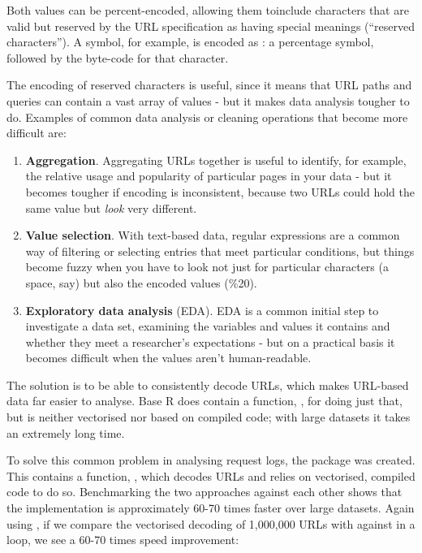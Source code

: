 Both values can be percent-encoded, allowing them toinclude characters
that are valid but reserved by the URL specification as having special
meanings (``reserved characters''). A \samp{\#} symbol, for example, is
encoded as : a percentage symbol, followed by the byte-code
for that character.

The encoding of reserved characters is useful, since it means that URL
paths and queries can contain a vast array of values - but it makes data
analysis tougher to do. Examples of common data analysis or cleaning
operations that become more difficult are:

\begin{enumerate}
\def\labelenumi{\arabic{enumi}.}
\itemsep1pt\parskip0pt
\item
  \textbf{Aggregation}. Aggregating URLs together is useful to identify,
  for example, the relative usage and popularity of particular pages in
  your data - but it becomes tougher if encoding is inconsistent,
  because two URLs could hold the same value but \emph{look} very
  different.
\item
  \textbf{Value selection}. With text-based data, regular expressions
  are a common way of filtering or selecting entries that meet
  particular conditions, but things become fuzzy when you have to look
  not just for particular characters (a space, say) but also the encoded
  values (\%20).
\item
  \textbf{Exploratory data analysis} (EDA). EDA is a common initial step
  to investigate a data set, examining the variables and values it
  contains and whether they meet a researcher's expectations - but on a
  practical basis it becomes difficult when the values aren't
  human-readable.
\end{enumerate}

The solution is to be able to consistently decode URLs, which makes
URL-based data far easier to analyse. Base R does contain a function,
, for doing just that, but is neither vectorised nor
based on compiled code; with large datasets it takes an extremely long
time.

To solve this common problem in analysing request logs,
the \citep{urltools} package was created. This
contains a function, , which decodes URLs and relies
on vectorised, compiled code to do so. Benchmarking the two approaches
against each other shows that the  implementation is
approximately 60-70 times faster over large datasets. Again using
, if we compare the vectorised decoding of 1,000,000
URLs with  against  in a 
loop, we see a 60-70 times speed improvement:

